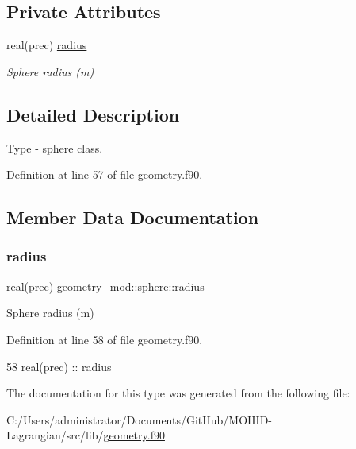 \subsection*{Private Attributes}
\begin{DoxyCompactItemize}
\item 
real(prec) \mbox{\hyperlink{structgeometry__mod_1_1sphere_aea9381f351c3670047fb7a779ef44fd7}{radius}}
\begin{DoxyCompactList}\small\item\em Sphere radius (m) \end{DoxyCompactList}\end{DoxyCompactItemize}


\subsection{Detailed Description}
Type -\/ sphere class. 

Definition at line 57 of file geometry.\+f90.



\subsection{Member Data Documentation}
\mbox{\label{structgeometry__mod_1_1sphere_aea9381f351c3670047fb7a779ef44fd7}} 
\subsubsection{\texorpdfstring{radius}{radius}}
{\footnotesize\ttfamily real(prec) geometry\+\_\+mod\+::sphere\+::radius\hspace{0.3cm}{\ttfamily [private]}}



Sphere radius (m) 



Definition at line 58 of file geometry.\+f90.


\begin{DoxyCode}
58         \textcolor{keywordtype}{real(prec)} :: radius
\end{DoxyCode}


The documentation for this type was generated from the following file\+:\begin{DoxyCompactItemize}
\item 
C\+:/\+Users/administrator/\+Documents/\+Git\+Hub/\+M\+O\+H\+I\+D-\/\+Lagrangian/src/lib/\mbox{\hyperlink{geometry_8f90}{geometry.\+f90}}\end{DoxyCompactItemize}
